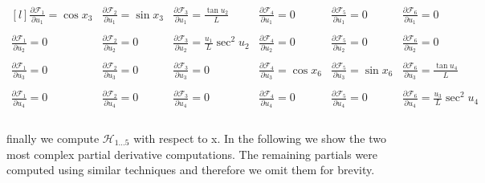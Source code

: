 \documentclass[paper=a4, fontsize=11pt]{scrartcl} %
\numberwithin{equation}{section} %
\numberwithin{figure}{section} %
\numberwithin{table}{section} %
\begin{document}
\begin{framed}
\[ \begin{matrix*}[l]
\frac{\partial\mathcal{F}_1}{\partial u_1} = \cos{x_3} &
\frac{\partial\mathcal{F}_2}{\partial u_1} = \sin{x_3} & 
\frac{\partial\mathcal{F}_3}{\partial u_1} = \frac{\tan{u_2}}{L} & 
\frac{\partial\mathcal{F}_4}{\partial u_1} = 0 & 
\frac{\partial\mathcal{F}_5}{\partial u_1} = 0 &  
\frac{\partial\mathcal{F}_6}{\partial u_1} = 0 & \\ \\
\frac{\partial\mathcal{F}_1}{\partial u_2} = 0 &
\frac{\partial\mathcal{F}_2}{\partial u_2} = 0 & 
\frac{\partial\mathcal{F}_3}{\partial u_2} = \frac{u_1}{L}\sec^2{u_2} & 
\frac{\partial\mathcal{F}_4}{\partial u_2} = 0 & 
\frac{\partial\mathcal{F}_5}{\partial u_2} = 0 &  
\frac{\partial\mathcal{F}_6}{\partial u_2} = 0 & \\ \\
\frac{\partial\mathcal{F}_1}{\partial u_3} = 0 &
\frac{\partial\mathcal{F}_2}{\partial u_3} = 0 & 
\frac{\partial\mathcal{F}_3}{\partial u_3} = 0 & 
\frac{\partial\mathcal{F}_4}{\partial u_3} = \cos{x_6} & 
\frac{\partial\mathcal{F}_5}{\partial u_3} = \sin{x_6} &  
\frac{\partial\mathcal{F}_6}{\partial u_3} = \frac{\tan{u_4}}{L} & \\ \\
\frac{\partial\mathcal{F}_1}{\partial u_4} = 0 &
\frac{\partial\mathcal{F}_2}{\partial u_4} = 0 & 
\frac{\partial\mathcal{F}_3}{\partial u_4} = 0 & 
\frac{\partial\mathcal{F}_4}{\partial u_4} = 0 & 
\frac{\partial\mathcal{F}_5}{\partial u_4} = 0 &  
\frac{\partial\mathcal{F}_6}{\partial u_4} = \frac{u_3}{L}\sec^2{u_4} & \\ \\
\end{matrix*}\]

finally we compute $\mathcal{H}_{1 \dots 5}$ with respect to x.  In the following we show the two most complex partial derivative computations. The remaining partials were computed using similar techniques and therefore we omit them for brevity.  


\end{framed}
\end{document}
